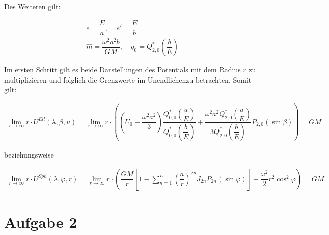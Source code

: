 Des Weiteren gilt:

\begin{gather*}
e = \dfrac{E}{a}, ~~~~~ e'= \dfrac{E}{b} \\
\hat{m} = \dfrac{\omega^2 a^2 b }{GM}, ~~~~~ q_0 = Q_{2,0}^{*} \left(\dfrac{b}{E}\right)
\end{gather*}

Im ersten Schritt gilt es beide Darstellungen des Potentials mit dem Radius $r$ zu multiplizieren und folglich die Grenzwerte 	\dq im Unendlichen\dq zu betrachten. Somit gilt: 

\begin{align*}
\lim_{r \rightarrow \infty} r \cdot U^{Ell}(\lambda,\beta,u) = \lim_{r \rightarrow \infty} r \cdot \left(\left(U_0 - \dfrac{\omega^2 a^2}{3}\right) \dfrac{Q_{0,0}^{*}\left(\dfrac{u}{E}\right)}{{Q_{0,0}^{*}\left(\dfrac{b}{E}\right)}} + \dfrac{\omega^2 a^2 Q_{2,0}^{*}\left(\dfrac{u}{E}\right)}{3 Q_{2,0}^{*}\left(\dfrac{b}{E}\right)} P_{2,0}(\sin \beta)\right) = GM
\end{align*}

beziehungsweise

\begin{align*}
\lim_{r \rightarrow \infty} r \cdot U^{Sph}(\lambda,\varphi,r) = \lim_{r \rightarrow \infty} r \cdot \left(\dfrac{GM}{r} \left[1-\sum_{n=1}^{L} \left(\dfrac{a}{r}\right)^{2n} J_{2n} P_{2n} (\sin \varphi)\right] + \dfrac{\omega^2}{2} r^2 \cos^2 \varphi\right) = GM
\end{align*}

\section*{Aufgabe 2}

